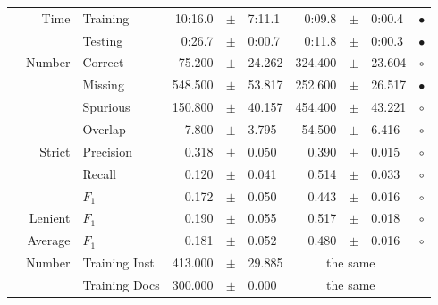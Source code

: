 \begin{longtable}{|r|r|l||rcl|rcl|c|}
\cline{2-10} & \multirow{2}{*}{      Time} &        Training &     10:16.0 &  $\pm$  &      7:11.1 &      0:09.8 &  $\pm$  &      0:00.4 & $\bullet$ \\
\cline{3-10} &                             &         Testing &      0:26.7 &  $\pm$  &      0:00.7 &      0:11.8 &  $\pm$  &      0:00.3 & $\bullet$ \\
\hline
\pagebreak
\hline
\hline
\multirow{11}{*}{\begin{sideways}purchabr\end{sideways} }
             & \multirow{4}{*}{    Number} &         Correct &      75.200 &  $\pm$  &      24.262 &     324.400 &  $\pm$  &      23.604 & $\circ$ \\
\cline{3-10} &                             &         Missing &     548.500 &  $\pm$  &      53.817 &     252.600 &  $\pm$  &      26.517 & $\bullet$ \\
\cline{3-10} &                             &        Spurious &     150.800 &  $\pm$  &      40.157 &     454.400 &  $\pm$  &      43.221 & $\circ$ \\
\cline{3-10} &                             &         Overlap &       7.800 &  $\pm$  &       3.795 &      54.500 &  $\pm$  &       6.416 & $\circ$ \\
\cline{2-10} & \multirow{3}{*}{    Strict} &       Precision &       0.318 &  $\pm$  &       0.050 &       0.390 &  $\pm$  &       0.015 & $\circ$ \\
\cline{3-10} &                             &          Recall &       0.120 &  $\pm$  &       0.041 &       0.514 &  $\pm$  &       0.033 & $\circ$ \\
\cline{3-10} &                             &           $F_1$ &       0.172 &  $\pm$  &       0.050 &       0.443 &  $\pm$  &       0.016 & $\circ$ \\
\cline{2-10} &                     Lenient &           $F_1$ &       0.190 &  $\pm$  &       0.055 &       0.517 &  $\pm$  &       0.018 & $\circ$ \\
\cline{2-10} &                     Average &           $F_1$ &       0.181 &  $\pm$  &       0.052 &       0.480 &  $\pm$  &       0.016 & $\circ$ \\
\cline{2-10} & \multirow{2}{*}{    Number} &   Training Inst &     413.000 &  $\pm$  &      29.885 &    \multicolumn{3}{c|}{the same}         &  \\
\cline{3-10} &                             &   Training Docs &     300.000 &  $\pm$  &       0.000 &    \multicolumn{3}{c|}{the same}         &  \\

\end{longtable}
